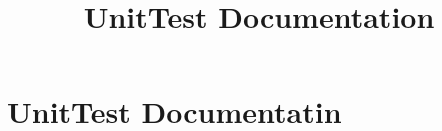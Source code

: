 \documentclass[10pt]{report}
\title{UnitTest Documentation}
\begin{document}
\chapter{UnitTest Documentatin} \label{cha:datastructures-documentation}



\end{document}
